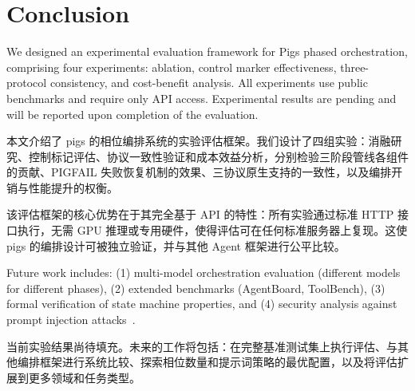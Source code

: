 \section{Conclusion}
\label{sec:conclusion}

We designed an experimental evaluation framework for Pigs phased orchestration, comprising four experiments: ablation, control marker effectiveness, three-protocol consistency, and cost-benefit analysis. All experiments use public benchmarks and require only API access. Experimental results are pending and will be reported upon completion of the evaluation.
\begin{chinese}
本文介绍了 pigs 的相位编排系统的实验评估框架。我们设计了四组实验：消融研究、控制标记评估、协议一致性验证和成本效益分析，分别检验三阶段管线各组件的贡献、PIGFAIL 失败恢复机制的效果、三协议原生支持的一致性，以及编排开销与性能提升的权衡。
\end{chinese}
\begin{chinese}
该评估框架的核心优势在于其完全基于 API 的特性：所有实验通过标准 HTTP 接口执行，无需 GPU 推理或专用硬件，使得评估可在任何标准服务器上复现。这使 pigs 的编排设计可被独立验证，并与其他 Agent 框架进行公平比较。
\end{chinese}

Future work includes: (1) multi-model orchestration evaluation (different models for different phases), (2) extended benchmarks (AgentBoard, ToolBench), (3) formal verification of state machine properties, and (4) security analysis against prompt injection attacks~\citep{greshake2023promptinjection}.
\begin{chinese}
当前实验结果尚待填充。未来的工作将包括：在完整基准测试集上执行评估、与其他编排框架进行系统比较、探索相位数量和提示词策略的最优配置，以及将评估扩展到更多领域和任务类型。
\end{chinese}

